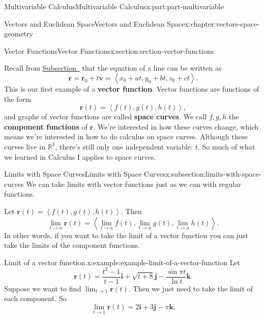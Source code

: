\documentclass[twoside,10pt,]{book}
\newcommand{\terminology}[1]{\textbf{#1}}
\numberwithin{equation}{part}
\newcommand{\RR}{\mathbb{R}}
\newcommand{\dotprod}[1]{\left\langle #1 \right\rangle}
\begin{document}
\begin{partptx}{Multivariable Calculus}{}{Multivariable Calculus}{}{}{x:part:part-multivariable}
\begin{chapterptx}{Vectors and Euclidean Space}{}{Vectors and Euclidean Space}{}{}{x:chapter:vectors-space-geometry}
\begin{sectionptx}{Vector Functions}{}{Vector Functions}{}{}{x:section:section-vector-functions}
\begin{introduction}{}
Recall from \hyperref[x:subsection:subsection-equations-of-lines]{Subsection~} that the equation of a line can be written as%
\begin{equation*}
\mathbf{r} = \mathbf{r}_{0}+t\mathbf{v} = \dotprod{x_{0}+at, y_{0}+bt, z_{0}+ct}.
\end{equation*}
This is our first example of a \terminology{vector function}. Vector functions are functions of the form%
\begin{equation*}
\mathbf{r}(t) = \dotprod{f(t),g(t),h(t)},
\end{equation*}
and graphs of vector functions are called \terminology{space curves}. We call \(f,g,h\) the \terminology{component functions} of \(\mathbf{r}\). We're interested in how these curves change, which means we're interested in how to do calculus on space curves. Although these curves live in \(\RR^{3}\), there's still only one independent variable: \(t\). So much of what we learned in Calculus I applies to space curves.%
\end{introduction}%
%
%
\typeout{************************************************}
\typeout{************************************************}
%
\begin{subsectionptx}{Limits with Space Curves}{}{Limits with Space Curves}{}{}{x:subsection:limits-with-space-curves}
We can take limits with vector functions just as we can with regular functions.%
\par
Let \(\mathbf{r}(t) = \dotprod{f(t),g(t),h(t)}\). Then%
%
\begin{equation}
\lim_{t\to a}\mathbf{r}(t) = \dotprod{\lim_{t\to a}f(t),\lim_{t\to a}g(t),\lim_{t\to a}h(t)}.\label{x:men:limits-vector-functions}
\end{equation}
In other words, if you want to take the limit of a vector function you can just take the limits of the component functions.%
\begin{example}{Limit of a vector function.}{x:example:example-limit-of-a-vector-function}%
Let%
%
\begin{equation*}
\mathbf{r}(t) = \frac{t^{2}-1}{t-1}\mathbf{i} + \sqrt{t+8}\mathbf{j} - \frac{\sin\pi t}{\ln t}\mathbf{k}.
\end{equation*}
Suppose we want to find \(\lim_{t\to 1}\mathbf{r}(t)\). Then we just need to take the limit of each component. So%
%
\begin{equation*}
\lim_{t\to1}\mathbf{r}(t) = 2\mathbf{i}+3\mathbf{j} -\pi\mathbf{k}.
\end{equation*}

\end{example}
\end{subsectionptx}
\end{sectionptx}
\end{chapterptx}
\end{partptx}
\end{document}
